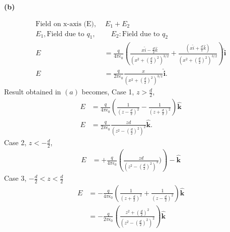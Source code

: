 \documentclass{article}
\begin{document}
\textbf{(b)}
\begin{figure}[!ht]
\centering
{}%

\label{fig,my_label}
\end{figure}
\begin{align*}
\text{Field on x-axis (E), } & \, E_1 + E_2 \\
E_1, \text{Field due to } q_1, & \quad E_2: \text{Field due to } q_2 \\
E &= \frac{q}{4 \pi \epsilon_0} 
\left( 
\frac{x\hat{i} - \frac{d}{2} \hat{k}}{\left(x^2 + \left(\frac{d}{2}\right)^2\right)^{3/2}} 
+ 
\frac{\left(x \hat{i} + \frac{d}{2}\hat{k}\right)}{\left(x^2 + \left(\frac{d}{2}\right)^2\right)^{3/2}}
\right) \mathbf{\hat{i}}
\\
E &= \frac{q}{2 \pi \epsilon_0} 
\frac{x}{\left(x^2 + \left(\frac{d}{2}\right)^2\right)^{3/2}} \mathbf{\hat{i}}.
\end{align*}
\textbf{} Result obtained in $(a)$ becomes,\newline 
Case 1, $z > \frac{d}{2}$,
\begin{align*}
E &= \frac{q}{4 \pi \epsilon_0} 
\left( 
\frac{1}{(z - \frac{d}{2})^2} - 
\frac{1}{(z + \frac{d}{2})^2}
\right) \mathbf{\hat{k}} \\ 
E &= \frac{q}{2 \pi \epsilon_0} 
\frac{zd}{(z^2 - (\frac{d}{2})^2)^2} \mathbf{\hat{k}}.
\end{align*}
Case 2, $z < -\frac{d}{2}$, 
\begin{align*}
E &= +\frac{q}{4 \pi \epsilon_0} 
\left( 
\frac{zd}{(z^2 - (\frac{d}{2})^2)^3} )
\right)-\mathbf{\hat{k}}
\end{align*}
Case 3, $-\frac{d}{2} < z < \frac{d}{2}$
\begin{align*}
E &= -\frac{q}{4 \pi \epsilon_0} 
\left( 
\frac{1}{(z + \frac{d}{2})^2} + 
\frac{1}{(z - \frac{d}{2})^2}
\right) \mathbf{\hat{k}} \\ 
&= -\frac{q}{2 \pi \epsilon_0} 
\left( 
\frac{z^2 + (\frac{d}{2})^2}{ (z^2 - (\frac{d}{2})^2)^2 } \right) \mathbf{\hat{k}}
\end{align*}
\end{document}
